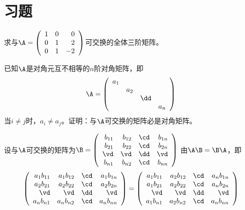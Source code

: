 \section{习题}

\begin{frame}
  \begin{footnotesize}
    \begin{exampleblock}{28}
      求与$\A=\left(
      \begin{array}{rrr}
        1&0&0\\
        0&1&2\\
        0&1&-2
      \end{array}
      \right)$可交换的全体三阶矩阵。
    \end{exampleblock}
  \end{footnotesize}
\end{frame}



\begin{frame}
  \begin{footnotesize}
    \begin{exampleblock}{29}
      已知$\A$是对角元互不相等的$n$阶对角矩阵，即
      $$
      \A=\left(
      \begin{array}{cccc}
        a_1&&&\\
        &a_2&&\\
        &&\dd&\\
        &&&a_n
      \end{array}
      \right)
      $$
      当$i\ne j$时，$a_i\ne a_j$。证明：与$\A$可交换的矩阵必是对角矩阵。
    \end{exampleblock}
    \pause\proofname
    设与$\A$可交换的矩阵为$\B=\left(
    \begin{array}{rrrr}
      b_{11}&b_{12}&\cd&b_{1n}\\
      b_{21}&b_{22}&\cd&b_{2n}\\
      \vd&\vd&\dd&\vd\\
      b_{n1}&b_{n2}&\cd&b_{nn}
    \end{array}
    \right)$
    由$\A\B=\B\A$，即
    $$
    \left(
    \begin{array}{rrrr}
      a_1b_{11}&a_1b_{12}&\cd&a_1b_{1n}\\
      a_2b_{21}&a_2b_{22}&\cd&a_2b_{2n}\\
      \vd&\vd&\dd&\vd\\
      a_nb_{n1}&a_nb_{n2}&\cd&a_nb_{nn}
    \end{array}
    \right)=\left(
    \begin{array}{rrrr}
      a_1b_{11}&a_2b_{12}&\cd&a_nb_{1n}\\
      a_1b_{21}&a_2b_{22}&\cd&a_nb_{2n}\\
      \vd&\vd&\dd&\vd\\
      a_1b_{n1}&a_2b_{n2}&\cd&a_nb_{nn}
    \end{array}
    \right)
    $$
  \end{footnotesize}
\end{frame}

